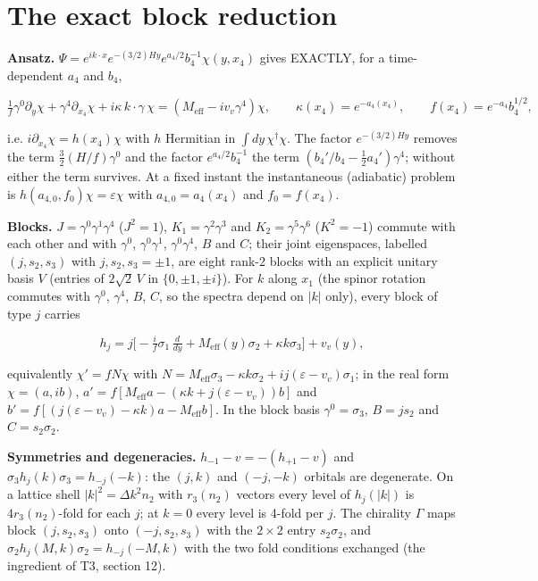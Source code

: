 \documentclass[11pt]{article}
\begin{document}
\section{The exact block reduction}

\textbf{Ansatz.} $\Psi = e^{ik\cdot x}e^{-(3/2)Hy}e^{a_4/2}b_4^{-1}\chi(y,x_4)$ gives EXACTLY, for a time-dependent $a_4$ and $b_4$,

\[
\tfrac1f\gamma^0\partial_y\chi + \gamma^4\partial_{x_4}\chi + i\kappa\,k\cdot\gamma\,\chi = (M_{\mathrm{eff}} - iv_v\gamma^4)\chi ,\qquad \kappa(x_4) = e^{-a_4(x_4)},\qquad f(x_4) = e^{-a_4}b_4^{1/2} ,
\]

i.e. $i\partial_{x_4}\chi = h(x_4)\chi$ with $h$ Hermitian in $\int dy\,\chi^\dagger\chi$. The factor $e^{-(3/2)Hy}$ removes the term $\tfrac32(H/f)\gamma^0$ and the factor $e^{a_4/2}b_4^{-1}$ the term $(b_4'/b_4 - \tfrac12a_4')\gamma^4$; without either the term survives. At a fixed instant the instantaneous (adiabatic) problem is $h(a_{4,0}, f_0)\chi = \varepsilon\chi$ with $a_{4,0} = a_4(x_4)$ and $f_0 = f(x_4)$.

\textbf{Blocks.} $J = \gamma^0\gamma^1\gamma^4$ ($J^2 = 1$), $K_1 = \gamma^2\gamma^3$ and $K_2 = \gamma^5\gamma^6$ ($K^2 = -1$) commute with each other and with $\gamma^0$, $\gamma^0\gamma^1$, $\gamma^0\gamma^4$, $B$ and $C$; their joint eigenspaces, labelled $(j, s_2, s_3)$ with $j, s_2, s_3 = \pm1$, are eight rank-2 blocks with an explicit unitary basis $V$ (entries of $2\sqrt2\,V$ in $\{0, \pm1, \pm i\}$). For $k$ along $x_1$ (the spinor rotation commutes with $\gamma^0$, $\gamma^4$, $B$, $C$, so the spectra depend on $|k|$ only), every block of type $j$ carries

\[
h_j = j\big[-\tfrac{i}{f}\sigma_1\,\tfrac{d}{dy} + M_{\mathrm{eff}}(y)\sigma_2 + \kappa k\sigma_3\big] + v_v(y) ,
\]

equivalently $\chi' = fN\chi$ with $N = M_{\mathrm{eff}}\sigma_3 - \kappa k\sigma_2 + ij(\varepsilon - v_v)\sigma_1$; in the real form $\chi = (a, ib)$, $a' = f[M_{\mathrm{eff}}a - (\kappa k + j(\varepsilon - v_v))b]$ and $b' = f[(j(\varepsilon - v_v) - \kappa k)a - M_{\mathrm{eff}}b]$. In the block basis $\gamma^0 = \sigma_3$, $B = js_2$ and $C = s_2\sigma_2$.

\textbf{Symmetries and degeneracies.} $h_{-1} - v = -(h_{+1} - v)$ and $\sigma_3h_j(k)\sigma_3 = h_{-j}(-k)$: the $(j,k)$ and $(-j,-k)$ orbitals are degenerate. On a lattice shell $|k|^2 = \Delta k^2n_2$ with $r_3(n_2)$ vectors every level of $h_j(|k|)$ is $4r_3(n_2)$-fold for each $j$; at $k = 0$ every level is 4-fold per $j$. The chirality $\Gamma$ maps block $(j, s_2, s_3)$ onto $(-j, s_2, s_3)$ with the $2 \times 2$ entry $s_2\sigma_2$, and $\sigma_2h_j(M,k)\sigma_2 = h_{-j}(-M,k)$ with the two fold conditions exchanged (the ingredient of T3, section 12).
\end{document}
